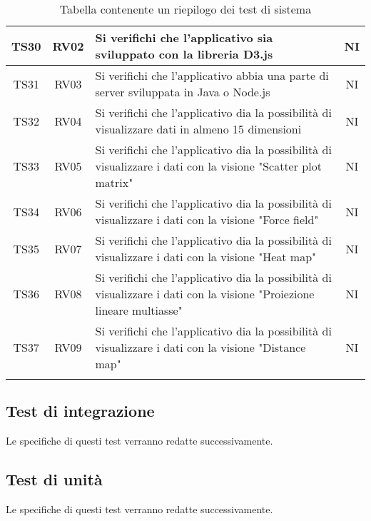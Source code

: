 \documentclass[../piano_di_qualifica.tex]{subfiles}
\begin{document}
\begin{center}
\begin{longtable}{|c|c|p{8.5cm}|c|}
      		TS30   & RV02   & Si verifichi che l'applicativo sia sviluppato con la libreria D3.js   & NI \\ \hline
      		TS31   & RV03    & Si verifichi che l'applicativo abbia una parte di server sviluppata in Java o Node.js   & NI \\ \hline
      		TS32   & RV04   & Si verifichi che l'applicativo dia la possibilità di visualizzare dati in almeno 15 dimensioni   & NI \\ \hline
      		TS33   & RV05  & Si verifichi che l'applicativo dia la possibilità di visualizzare i dati con la visione "Scatter plot matrix"  & NI \\ \hline
      		TS34   & RV06   & Si verifichi che l'applicativo dia la possibilità di visualizzare i dati con la visione "Force field"  & NI \\ \hline
      		TS35   & RV07  & Si verifichi che l'applicativo dia la possibilità di visualizzare i dati con la visione "Heat map"  & NI \\ \hline
      		TS36   & RV08   & Si verifichi che l'applicativo dia la possibilità di visualizzare i dati con la visione "Proiezione lineare multiasse"    & NI \\ \hline
      		TS37    & RV09   & Si verifichi che l'applicativo dia la possibilità di visualizzare i dati con la visione "Distance map"   & NI \\ \hline	
		\hline
		\rowcolor{white}
		\caption{Tabella contenente un riepilogo dei test di sistema}
	\end{longtable}

\end{center}


\subsection{Test di integrazione}%
\label{sub:test_int}
Le specifiche di questi test verranno redatte successivamente.

\subsection{Test di unità}%
\label{sub:test_unit}
Le specifiche di questi test verranno redatte successivamente.
\end{document}
